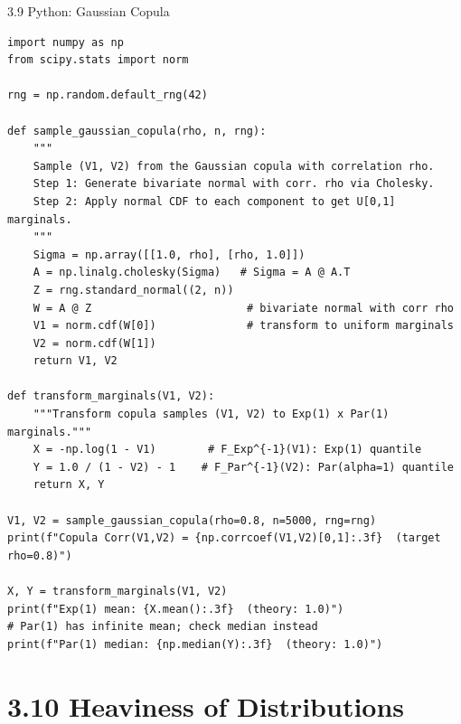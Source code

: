 \documentclass[aspectratio=169,10pt]{beamer}
\begin{document}
\begin{frame}[fragile]{3.9 Python: Gaussian Copula}
\begin{lstlisting}[style=python, caption={Gaussian copula simulation with arbitrary marginals (Example 3.9.10)}]
import numpy as np
from scipy.stats import norm

rng = np.random.default_rng(42)

def sample_gaussian_copula(rho, n, rng):
    """
    Sample (V1, V2) from the Gaussian copula with correlation rho.
    Step 1: Generate bivariate normal with corr. rho via Cholesky.
    Step 2: Apply normal CDF to each component to get U[0,1] marginals.
    """
    Sigma = np.array([[1.0, rho], [rho, 1.0]])
    A = np.linalg.cholesky(Sigma)   # Sigma = A @ A.T
    Z = rng.standard_normal((2, n))
    W = A @ Z                        # bivariate normal with corr rho
    V1 = norm.cdf(W[0])              # transform to uniform marginals
    V2 = norm.cdf(W[1])
    return V1, V2

def transform_marginals(V1, V2):
    """Transform copula samples (V1, V2) to Exp(1) x Par(1) marginals."""
    X = -np.log(1 - V1)        # F_Exp^{-1}(V1): Exp(1) quantile
    Y = 1.0 / (1 - V2) - 1    # F_Par^{-1}(V2): Par(alpha=1) quantile
    return X, Y

V1, V2 = sample_gaussian_copula(rho=0.8, n=5000, rng=rng)
print(f"Copula Corr(V1,V2) = {np.corrcoef(V1,V2)[0,1]:.3f}  (target rho=0.8)")

X, Y = transform_marginals(V1, V2)
print(f"Exp(1) mean: {X.mean():.3f}  (theory: 1.0)")
# Par(1) has infinite mean; check median instead
print(f"Par(1) median: {np.median(Y):.3f}  (theory: 1.0)")
\end{lstlisting}
\end{frame}

\section{3.10 Heaviness of Distributions}
\end{document}
